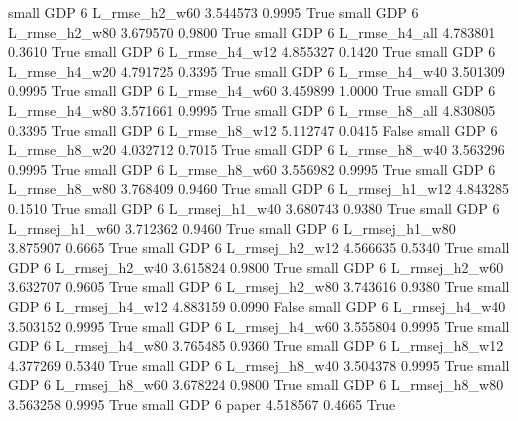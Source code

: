      small      GDP                 6  L_rmse_h2_w60   3.544573      0.9995    True
     small      GDP                 6  L_rmse_h2_w80   3.679570      0.9800    True
     small      GDP                 6  L_rmse_h4_all   4.783801      0.3610    True
     small      GDP                 6  L_rmse_h4_w12   4.855327      0.1420    True
     small      GDP                 6  L_rmse_h4_w20   4.791725      0.3395    True
     small      GDP                 6  L_rmse_h4_w40   3.501309      0.9995    True
     small      GDP                 6  L_rmse_h4_w60   3.459899      1.0000    True
     small      GDP                 6  L_rmse_h4_w80   3.571661      0.9995    True
     small      GDP                 6  L_rmse_h8_all   4.830805      0.3395    True
     small      GDP                 6  L_rmse_h8_w12   5.112747      0.0415   False
     small      GDP                 6  L_rmse_h8_w20   4.032712      0.7015    True
     small      GDP                 6  L_rmse_h8_w40   3.563296      0.9995    True
     small      GDP                 6  L_rmse_h8_w60   3.556982      0.9995    True
     small      GDP                 6  L_rmse_h8_w80   3.768409      0.9460    True
     small      GDP                 6 L_rmsej_h1_w12   4.843285      0.1510    True
     small      GDP                 6 L_rmsej_h1_w40   3.680743      0.9380    True
     small      GDP                 6 L_rmsej_h1_w60   3.712362      0.9460    True
     small      GDP                 6 L_rmsej_h1_w80   3.875907      0.6665    True
     small      GDP                 6 L_rmsej_h2_w12   4.566635      0.5340    True
     small      GDP                 6 L_rmsej_h2_w40   3.615824      0.9800    True
     small      GDP                 6 L_rmsej_h2_w60   3.632707      0.9605    True
     small      GDP                 6 L_rmsej_h2_w80   3.743616      0.9380    True
     small      GDP                 6 L_rmsej_h4_w12   4.883159      0.0990   False
     small      GDP                 6 L_rmsej_h4_w40   3.503152      0.9995    True
     small      GDP                 6 L_rmsej_h4_w60   3.555804      0.9995    True
     small      GDP                 6 L_rmsej_h4_w80   3.765485      0.9360    True
     small      GDP                 6 L_rmsej_h8_w12   4.377269      0.5340    True
     small      GDP                 6 L_rmsej_h8_w40   3.504378      0.9995    True
     small      GDP                 6 L_rmsej_h8_w60   3.678224      0.9800    True
     small      GDP                 6 L_rmsej_h8_w80   3.563258      0.9995    True
     small      GDP                 6          paper   4.518567      0.4665    True
